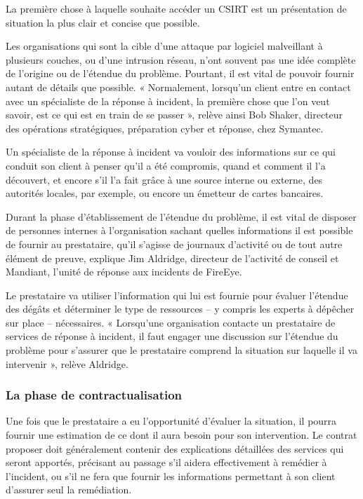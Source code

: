 La première chose à laquelle souhaite accéder un CSIRT est un présentation de situation la plus clair et concise  que possible.

 Les organisations qui sont la cible d’une attaque par logiciel malveillant à plusieurs couches, ou d’une intrusion réseau, n’ont souvent pas une idée complète de l’origine ou de l’étendue du problème. Pourtant, il est vital de pouvoir fournir autant de détails que possible. « Normalement, lorsqu’un client entre en contact avec un spécialiste de la réponse à incident, la première chose que l’on veut savoir, est ce qui est en train de se passer », relève ainsi Bob Shaker, directeur des opérations stratégiques, préparation cyber et réponse, chez Symantec.

Un spécialiste de la réponse à incident va vouloir des informations sur ce qui conduit son client à penser qu’il a été compromis, quand et comment il l’a découvert, et encore s’il l’a fait grâce à une source interne ou externe, des autorités locales, par exemple, ou encore un émetteur de cartes bancaires.

Durant la phase d’établissement de l’étendue du problème, il est vital de disposer de personnes internes à l’organisation sachant quelles informations il est possible de fournir au prestataire, qu’il s’agisse de journaux d’activité ou de tout autre élément de preuve, explique Jim Aldridge, directeur de l’activité de conseil et Mandiant, l’unité de réponse aux incidents de FireEye.

Le prestataire va utiliser l’information qui lui est fournie pour évaluer l’étendue des dégâts et déterminer le type de ressources – y compris les experts à dépêcher sur place – nécessaires. « Lorsqu’une organisation contacte un prestataire de services de réponse à incident, il faut engager une discussion sur l’étendue du problème pour s’assurer que le prestataire comprend la situation sur laquelle il va intervenir », relève Aldridge.

\subsubsection{La phase de contractualisation}

Une fois que le prestataire a eu l’opportunité d’évaluer la situation, il pourra fournir une estimation de ce dont il aura besoin pour son intervention. Le contrat proposer doit généralement contenir des explications détaillées des services qui seront apportés, précisant au passage s’il aidera effectivement à remédier à l’incident, ou s’il ne fera que fournir les informations permettant à son client d’assurer seul la remédiation.

